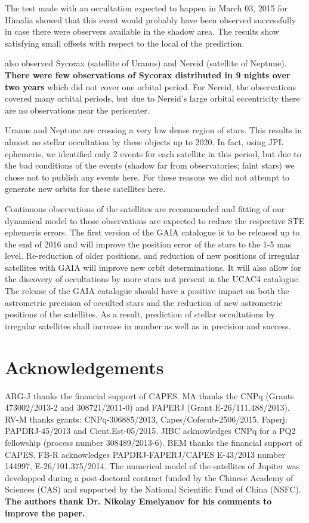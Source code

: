 \documentclass[useAMS,usenatbib]{mn2e}
\begin{document}
The test made with an occultation expected to happen in March 03, 2015 for Himalia showed that this event would probably have been observed successfully in case there were observers available in the shadow area. The results show satisfying small offsets with respect to the local of the prediction.

 also observed Sycorax (satellite of Uranus) and Nereid (satellite of Neptune). \textbf{There were few observations of Sycorax distributed in 9 nights over two years} which did not cover one orbital period. For Nereid, the observations covered many orbital periods, but due to Nereid's large orbital eccentricity there are no observations near the pericenter.

Uranus and Neptune are crossing a very low dense region of stars. This results in almost no stellar occultation by these objects up to 2020. In fact, using JPL ephemeris, we identified only 2 events for each satellite in this period, but due to the bad conditions of the events (shadow far from observatories; faint stars) we chose not to publish any events here.  For these reasons we did not attempt to generate new orbits for these satellites here.

Continuous observations of the satellites are recommended and fitting of our dynamical model to those observations are expected to reduce the respective STE ephemeris errors. The first version of the GAIA catalogue is to be released up to the end of 2016 and will improve the position error of the stars to the 1-5 mas level. Re-reduction of older positions, and reduction of new positions of irregular satellites with GAIA will improve new orbit determinations. It will also allow for the discovery of occultations by more stars not present in the UCAC4 catalogue.
The release of the GAIA catalogue should have a positive impact on both the astrometric precision of occulted stars and the reduction of new astrometric positions of the satellites. As a result, prediction of stellar occultations by irregular satellites shall increase in number as well as in precision and success.

\section*{Acknowledgements}

ARG-J thanks the financial support of CAPES.
MA thanks the CNPq (Grants 473002/2013-2 and 308721/2011-0) and FAPERJ (Grant E-26/111.488/2013).
RV-M thanks grants: CNPq-306885/2013, Capes/Cofecub-2506/2015, Faperj: PAPDRJ-45/2013 and Cient.Est-05/2015.
JIBC acknowledges CNPq for a PQ2 fellowship (process number 308489/2013-6).
BEM thanks the financial support of CAPES.
FB-R acknowledges PAPDRJ-FAPERJ/CAPES E-43/2013 number 144997, E-26/101.375/2014.
The numerical model of the satellites of Jupiter was developped during a post-doctoral contract funded by the Chinese Academy of Sciences (CAS) and supported by the National Scientific Fund of China (NSFC).
\textbf{The authors thank Dr. Nikolay Emelyanov for his comments to improve the paper.}






\label{lastpage}
\end{document}
